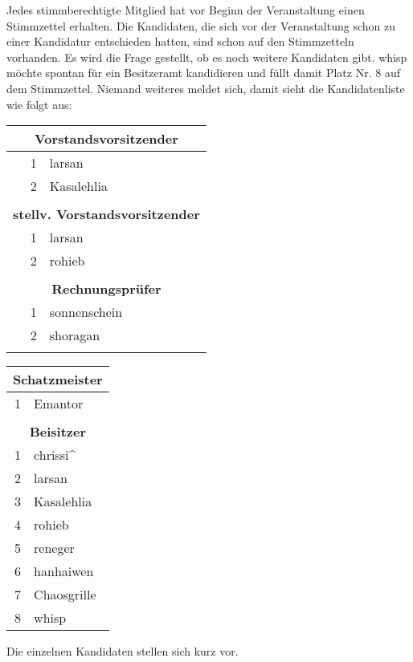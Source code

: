 \documentclass[parskip=half-]{s0minutes}
\begin{document}
Jedes stimmberechtigte Mitglied hat vor Beginn der Veranstaltung einen
Stimmzettel erhalten. Die Kandidaten, die sich vor der Veranstaltung schon zu
einer Kandidatur entschieden hatten, sind schon auf den Stimmzetteln vorhanden.
Es wird die Frage gestellt, ob es noch weitere Kandidaten gibt. whisp möchte
spontan für ein Besitzeramt kandidieren und füllt damit Platz Nr. 8 auf dem
Stimmzettel. Niemand weiteres meldet sich, damit sieht die Kandidatenliste wie
folgt aus:

\begin{center}
\begin{multicols}{2}
\begin{tabular}{r l}
	\multicolumn{2}{c}{\bfseries Vorstandsvorsitzender} \\ \hline 
	1 & larsan \\
	2 & Kasalehlia \\
	\\
	\multicolumn{2}{c}{\bfseries stellv. Vorstandsvorsitzender} \\ \hline
	1 & larsan \\
	2 & rohieb \\
	\\
	\multicolumn{2}{c}{\bfseries Rechnungsprüfer} \\ \hline
	1 & sonnenschein \\
  2 & shoragan \\
	\\
\end{tabular}
\columnbreak
\begin{tabular}{r l}
	\multicolumn{2}{c}{\bfseries Schatzmeister} \\ \hline
	1 & Emantor \\
	\\
	\multicolumn{2}{c}{\bfseries Beisitzer} \\ \hline
	1 & chrissi\^{} \\
  2 & larsan \\
  3 & Kasalehlia \\
  4 & rohieb \\
  5 & reneger \\
  6 & hanhaiwen \\
  7 & Chaosgrille \\
	8 & whisp \\
\end{tabular}
\end{multicols}
\end{center}

Die einzelnen Kandidaten stellen sich kurz vor.
\end{document}

